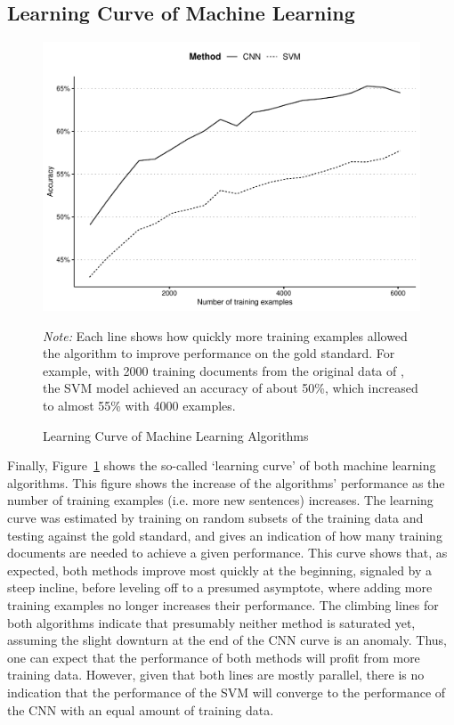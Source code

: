 \subsection{Learning Curve of Machine Learning}
\begin{figure}[htp!]
\caption{Learning Curve of Machine Learning Algorithms}\label{fig:curve}
 
{\centering\includegraphics[width=.8\textwidth]{figures/fig_curve.pdf}}

\emph{Note:} Each line shows how quickly more training examples allowed the algorithm to improve performance on the gold standard. For example, with 2000 training documents from the original data of \cite{boukes2019}, the SVM model achieved an accuracy of about 50\%, which increased to almost 55\% with 4000 examples.
\end{figure}

\noindent Finally, Figure~\ref{fig:curve} shows the so-called `learning curve' of both machine learning algorithms. 
This figure shows the increase of the algorithms' performance as the number of training examples (i.e. more new sentences) increases.
The learning curve was estimated by training on random subsets of the training data and testing against the gold standard,
and gives an indication of how many training documents are needed to achieve a given performance. 
This curve shows that, as expected, both methods improve most quickly at the beginning, signaled by a steep incline, before leveling off to a presumed asymptote, where adding more training examples no longer increases their performance. 
The climbing lines for both algorithms indicate that presumably neither method is saturated yet, assuming the slight downturn at the end of the CNN curve is an anomaly. 
Thus, one can expect that the performance of both methods will profit from more training data.
However, given that both lines are mostly parallel, there is no indication that the performance of the SVM will converge to the performance of the CNN with an equal amount of training data.

